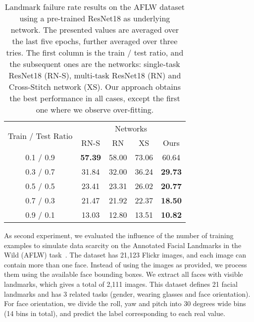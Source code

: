 \documentclass[runningheads]{llncs}
\newcommand{\citep}{\cite}
\begin{document}
\begin{table}[t]
    \renewcommand{\arraystretch}{1}
    \setlength\tabcolsep{15pt}
    \centering
    \caption{Landmark failure rate results on the AFLW dataset using a pre-trained ResNet18 as underlying network. The presented values are averaged over the last five epochs, further averaged over three tries. The first column is the train / test ratio, and the subsequent ones are the networks: single-task ResNet18 (RN-S), multi-task ResNet18 (RN) and Cross-Stitch network (XS). Our approach obtains the best performance in all cases, except the first one where we observe over-fitting.}
    \label{tab:results-aflw-resnet18}
    \begin{tabular}{ccccc}
        \toprule
        \multirow{2}{*}{
            \begin{minipage}[t]{0.25\columnwidth}%
                \centering
                Train / Test Ratio %
        \end{minipage}} & \multicolumn{4}{c}{Networks} \\
        \cmidrule{2-5}
        & RN-S & RN &  XS & Ours \\
        \midrule
        0.1 / 0.9 & \textbf{57.39} & 58.00 & 73.06 & 60.64 \\
        0.3 / 0.7 & 31.84 & 32.00 & 36.24 & \textbf{29.73} \\
        0.5 / 0.5 & 23.41 & 23.31 & 26.02 & \textbf{20.77} \\
        0.7 / 0.3 & 21.47 & 21.92 & 22.37 & \textbf{18.50} \\
        0.9 / 0.1 & 13.03 & 12.80 & 13.51 & \textbf{10.82} \\
        \bottomrule
    \end{tabular}
\end{table}


As second experiment, we evaluated the influence of the number of training examples to simulate data scarcity on the Annotated Facial Landmarks in the Wild (AFLW) task~\citep{koestinger2011annotated}. The dataset has 21,123 Flickr images, and each image can contain more than one face. Instead of using the images as provided, we process them using the available face bounding boxes. We extract all faces with visible landmarks, which gives a total of 2,111 images. This dataset defines 21 facial landmarks and has 3 related tasks (gender, wearing glasses and face orientation). For face orientation, we divide the roll, yaw and pitch into 30 degrees wide bins (14 bins in total), and predict the label corresponding to each real value.
\end{document}

